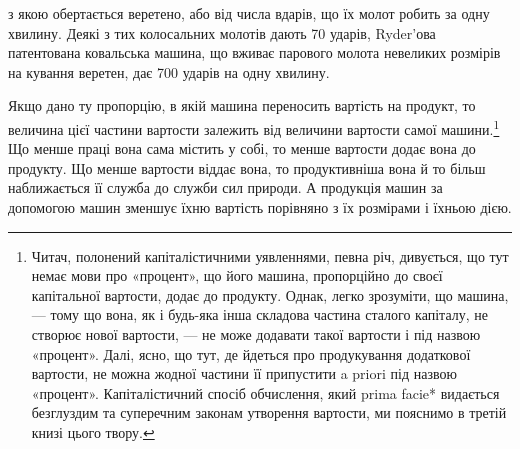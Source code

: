 з якою обертається веретено, або від числа вдарів, що їх молот
робить за одну хвилину. Деякі з тих колосальних молотів дають
70 ударів, Ryder’ова патентована ковальська машина, що вживає
парового молота невеликих розмірів на кування веретен, дає
700 ударів на одну хвилину.

Якщо дано ту пропорцію, в якій машина переносить вартість
на продукт, то величина цієї частини вартости залежить від величини
вартости самої машини.\footnote{
Читач, полонений капіталістичними уявленнями, певна річ, дивується,
що тут немає мови про «процент», що його машина, пропорційно
до своєї капітальної вартости, додає до продукту. Однак, легко зрозуміти,
що машина, — тому що вона, як і будь-яка інша складова частина
сталого капіталу, не створює нової вартости, — не може додавати такої
вартости і під назвою «процент». Далі, ясно, що тут, де йдеться про продукування
додаткової вартости, не можна жодної частини її припустити
a priori під назвою «процент». Капіталістичний спосіб обчислення,
який prima facie* видається безглуздим та суперечним законам утворення
вартости, ми пояснимо в третій книзі цього твору.
} Що менше праці вона сама містить
у собі, то менше вартости додає вона до продукту. Що менше
вартости віддає вона, то продуктивніша вона й то більш наближається
її служба до служби сил природи. А продукція машин за
допомогою машин зменшує їхню вартість порівняно з їх розмірами
і їхньою дією.

